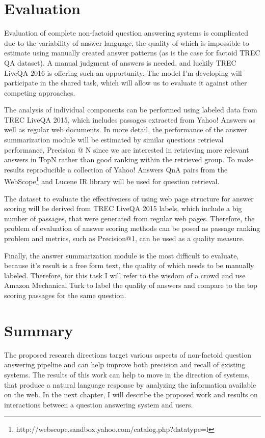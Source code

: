 \section{Evaluation}
\label{sec:non-factoid:architecture:evaluation}

Evaluation of complete non-factoid question answering systems is complicated due to the variability of answer language, the quality of which is impossible to estimate using manually created answer patterns (as is the case for factoid TREC QA dataset).
A manual judgment of answers is needed, and luckily TREC LiveQA 2016 is offering such an opportunity.
The model I'm developing will participate in the shared task, which will allow us to evaluate it against other competing approaches.

The analysis of individual components can be performed using labeled data from TREC LiveQA 2015, which includes passages extracted from Yahoo! Answers as well as regular web documents.
In more detail, the performance of the answer summarization module will be estimated by similar questions retrieval performance, \eg Precision @ N since we are interested in retrieving more relevant answers in TopN rather than good ranking within the retrieved group.
To make results reproducible a collection of Yahoo! Answers QnA pairs from the WebScope\footnote{http://webscope.sandbox.yahoo.com/catalog.php?datatype=l} and Lucene IR library will be used for question retrieval.

The dataset to evaluate the effectiveness of using web page structure for answer scoring will be derived from TREC LiveQA 2015 labels, which include a big number of passages, that were generated from regular web pages.
Therefore, the problem of evaluation of answer scoring methods can be posed as passage ranking problem and metrics, such as Precision@1, can be used as a quality measure.

Finally, the answer summarization module is the most difficult to evaluate, because it's result is a free form text, the quality of which needs to be manually labeled.
Therefore, for this task I will refer to the wisdom of a crowd and use Amazon Mechanical Turk to label the quality of answers and compare to the top scoring passages for the same question.

\section{Summary}
\label{sec:non-factoid:summary}

The proposed research directions target various aspects of non-factoid question answering pipeline and can help improve both precision and recall of existing systems.
The results of this work can help to move in the direction of systems, that produce a natural language response by analyzing the information available on the web.
In the next chapter, I will describe the proposed work and results on interactions between a question answering system and users.

